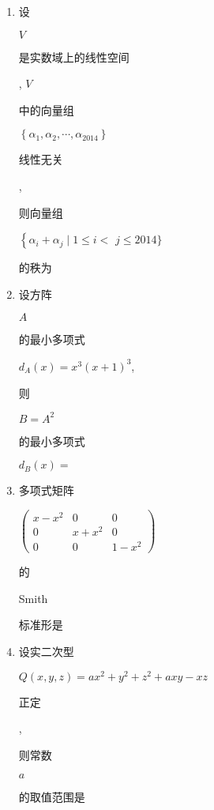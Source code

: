 \documentclass[10pt]{article}
\begin{document}
\begin{enumerate}
  \item \begin{CJK}{UTF8}{mj}设\end{CJK} $V$ \begin{CJK}{UTF8}{mj}是实数域上的线性空间\end{CJK}, $V$ \begin{CJK}{UTF8}{mj}中的向量组\end{CJK} $\left\{\alpha_{1}, \alpha_{2}, \cdots, \alpha_{2014}\right\}$ \begin{CJK}{UTF8}{mj}线性无关\end{CJK}, \begin{CJK}{UTF8}{mj}则向量组\end{CJK} $\left\{\alpha_{i}+\alpha_{j} \mid 1 \leqslant i<\right.$ $j \leqslant 2014\}$ \begin{CJK}{UTF8}{mj}的秩为\end{CJK}

  \item \begin{CJK}{UTF8}{mj}设方阵\end{CJK} $A$ \begin{CJK}{UTF8}{mj}的最小多项式\end{CJK} $d_{A}(x)=x^{3}(x+1)^{3}$, \begin{CJK}{UTF8}{mj}则\end{CJK} $B=A^{2}$ \begin{CJK}{UTF8}{mj}的最小多项式\end{CJK} $d_{B}(x)=$

  \item \begin{CJK}{UTF8}{mj}多项式矩阵\end{CJK} $\left(\begin{array}{ccc}x-x^{2} & 0 & 0 \\ 0 & x+x^{2} & 0 \\ 0 & 0 & 1-x^{2}\end{array}\right)$ \begin{CJK}{UTF8}{mj}的\end{CJK} Smith \begin{CJK}{UTF8}{mj}标准形是\end{CJK}

  \item \begin{CJK}{UTF8}{mj}设实二次型\end{CJK} $Q(x, y, z)=a x^{2}+y^{2}+z^{2}+a x y-x z$ \begin{CJK}{UTF8}{mj}正定\end{CJK}, \begin{CJK}{UTF8}{mj}则常数\end{CJK} $a$ \begin{CJK}{UTF8}{mj}的取值范围是\end{CJK}

\end{enumerate}
\end{document}
